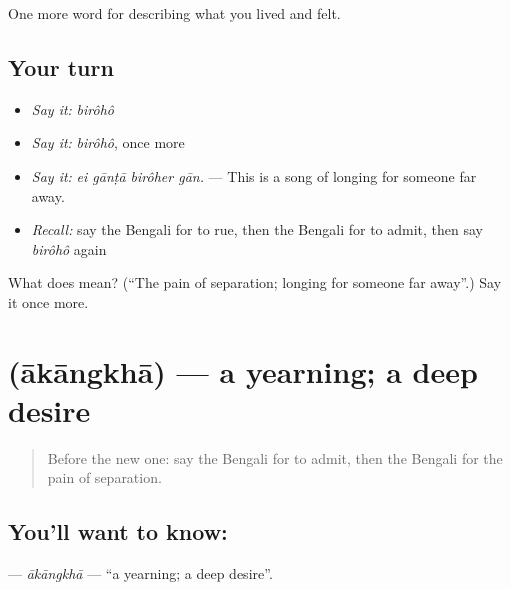 \begin{grammarlens}[title={What you've built}]
One more word for describing what you lived and felt.
\end{grammarlens}

\subsection*{Your turn}
\begin{itemize}
\raggedright
  \item \emph{Say it:} \emph{birôhô}
  \item \emph{Say it:} \emph{birôhô}, once more
  \item \emph{Say it:} \emph{ei gānṭā birôher gān.} — This is a song of longing for someone far away.
  \item \emph{Recall:} say the Bengali for to rue, then the Bengali for to admit, then say \emph{birôhô} again
\end{itemize}

\begin{tcolorbox}[breakable,colback=teal!4,colframe=teal!35!black,title={Before you move on}]
What does  mean? (\textquotedblleft{}The pain of separation; longing for someone far away\textquotedblright{}.) Say it once more.
\end{tcolorbox}
\section[\texorpdfstring{\bn{আকাঙ্ক্ষা} (ākāngkhā)}{আকাঙ্ক্ষা (ākāngkhā)}]{ (ākāngkhā) — a yearning; a deep desire}

\label{lesson:BN-C448-akangkha}



\begin{quote}
Before the new one: say the Bengali for to admit, then the Bengali for the pain of separation.
\end{quote}

\subsection*{You'll want to know: }
\textbf{} — \emph{ākāngkhā} — \textquotedblleft{}a yearning; a deep desire\textquotedblright{}.

\begin{quote}
    
\end{quote}


